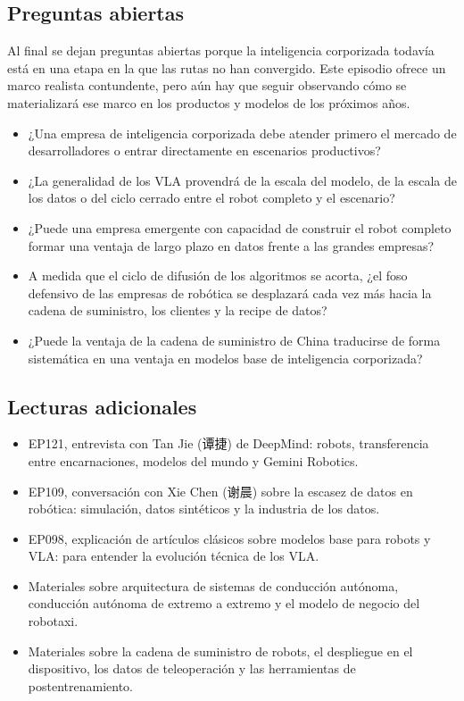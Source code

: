 \subsection{Preguntas abiertas}

Al final se dejan preguntas abiertas porque la inteligencia corporizada todavía está en una etapa en la que las rutas no han convergido. Este episodio ofrece un marco realista contundente, pero aún hay que seguir observando cómo se materializará ese marco en los productos y modelos de los próximos años.

\begin{itemize}
\item ¿Una empresa de inteligencia corporizada debe atender primero el mercado de desarrolladores o entrar directamente en escenarios productivos?
\item ¿La generalidad de los VLA provendrá de la escala del modelo, de la escala de los datos o del ciclo cerrado entre el robot completo y el escenario?
\item ¿Puede una empresa emergente con capacidad de construir el robot completo formar una ventaja de largo plazo en datos frente a las grandes empresas?
\item A medida que el ciclo de difusión de los algoritmos se acorta, ¿el foso defensivo de las empresas de robótica se desplazará cada vez más hacia la cadena de suministro, los clientes y la recipe de datos?
\item ¿Puede la ventaja de la cadena de suministro de China traducirse de forma sistemática en una ventaja en modelos base de inteligencia corporizada?
\end{itemize}

\subsection{Lecturas adicionales}

\begin{itemize}
\item EP121, entrevista con Tan Jie (谭捷) de DeepMind: robots, transferencia entre encarnaciones, modelos del mundo y Gemini Robotics.
\item EP109, conversación con Xie Chen (谢晨) sobre la escasez de datos en robótica: simulación, datos sintéticos y la industria de los datos.
\item EP098, explicación de artículos clásicos sobre modelos base para robots y VLA: para entender la evolución técnica de los VLA.
\item Materiales sobre arquitectura de sistemas de conducción autónoma, conducción autónoma de extremo a extremo y el modelo de negocio del robotaxi.
\item Materiales sobre la cadena de suministro de robots, el despliegue en el dispositivo, los datos de teleoperación y las herramientas de postentrenamiento.
\end{itemize}

